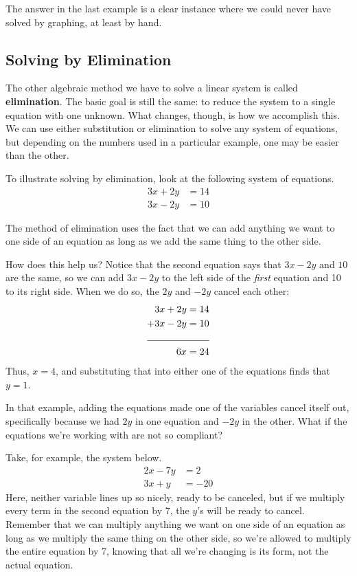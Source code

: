 The answer in the last example is a clear instance where we could never have solved by graphing, at least by hand.
\pagebreak

\subsection{Solving by Elimination}
The other algebraic method we have to solve a linear system is called \textbf{elimination}.  The basic goal is still the same: to reduce the system to a single equation with one unknown.  What changes, though, is how we accomplish this.  We can use either substitution or elimination to solve any system of equations, but depending on the numbers used in a particular example, one may be easier than the other.

To illustrate solving by elimination, look at the following system of equations.
\begin{align*}
3x+2y &= 14\\
3x-2y &= 10
\end{align*}

The method of elimination uses the fact that we can add anything we want to one side of an equation as long as we add the same thing to the other side.

How does this help us?  Notice that the second equation says that $3x-2y$ and $10$ are the same, so we can add $3x-2y$ to the left side of the \emph{first} equation and 10 to its right side.  When we do so, the $2y$ and $-2y$ cancel each other:
\begin{alignat*}{1}
3x+2y &= 14\\
+3x-2y &= 10\\
\cline{0-1}
6x &= 24
\end{alignat*}
Thus, $x=4$, and substituting that into either one of the equations finds that $y=1$.

In that example, adding the equations made one of the variables cancel itself out, specifically because we had $2y$ in one equation and $-2y$ in the other.  What if the equations we're working with are not so compliant?

Take, for example, the system below.
\begin{align*}
2x-7y &= 2\\
3x+y &= -20
\end{align*}
Here, neither variable lines up so nicely, ready to be canceled, but if we multiply every term in the second equation by 7, the $y$'s will be ready to cancel.  Remember that we can multiply anything we want on one side of an equation as long as we multiply the same thing on the other side, so we're allowed to multiply the entire equation by 7, knowing that all we're changing is its form, not the actual equation.

